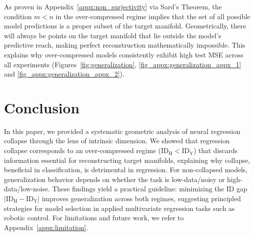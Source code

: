 \documentclass{article}
\newcommand{\idh}{\ensuremath{\mathrm{ID}_{\mathrm{H}}}}
\newcommand{\idy}{\ensuremath{\mathrm{ID}_{\mathrm{Y}}}}
\theoremstyle{plain}
\theoremstyle{definition}
\theoremstyle{remark}
\begin{document}
As proven in Appendix~\ref{appx:non_surjectivity} via Sard's Theorem, the condition $m < n$ in the over-compressed regime implies that the set of all possible model predictions is a proper subset of the target manifold. Geometrically, there will always be points on the target manifold that lie outside the model's predictive reach, making perfect reconstruction mathematically impossible. This explains why over-compressed models consistently exhibit high test MSE across all experiments (Figures~\ref{fig:generalization}, \ref{fig_appx:generalization_appx_1} and \ref{fig_appx:generalization_appx_2}).

\section{Conclusion}
In this paper, we provided a systematic geometric analysis of neural regression collapse through the lens of intrinsic dimension. We showed that regression collapse corresponds to an over-compressed regime ($\idh < \idy$) that discards information essential for reconstructing target manifolds, explaining why collapse, beneficial in classification, is detrimental in regression. For non-collapsed models, generalization behavior depends on whether the task is low-data/noisy or high-data/low-noise. These findings yield a practical guideline: minimizing the ID gap $|\idh - \idy|$ improves generalization across both regimes, suggesting principled strategies for model selection in applied multivariate regression tasks such as robotic control. For limitations and future work, we refer to Appendix~\ref{appx:limitation}.






\newpage




\newpage


% 
\end{document}
